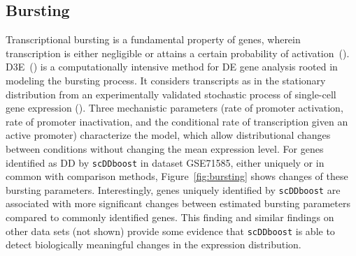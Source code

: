 \documentclass[aoas,preprint]{imsart}
\begin{document}





\subsection{Bursting}


Transcriptional bursting is a fundamental property of genes, wherein transcription is either
negligible or attains a certain probability of activation~(\cite{Raj:2008aa}). 
D3E~(\cite{ref:d3e}) is a computationally intensive 
method for DE gene analysis rooted in modeling the bursting process. It 
considers transcripts as in the stationary distribution from an 
experimentally validated stochastic process of single-cell gene expression (\cite{Peccoud:1995aa}). 
Three mechanistic parameters (rate of promoter activation, rate of promoter inactivation, 
 and the conditional rate of transcription given an active  promoter) characterize the model, which allow
 distributional changes between conditions without changing the mean expression level.
For genes identified as DD by \verb+scDDboost+ in dataset GSE71585, either uniquely or in common with
comparison methods, Figure~\ref{fig:bursting} shows  changes of these bursting parameters. Interestingly, 
 genes uniquely identified by \verb+scDDboost+ are associated with more 
significant changes between estimated bursting parameters compared to commonly identified genes.
This finding and similar findings on other data sets (not shown) provide some evidence that \verb+scDDboost+
is able to detect biologically meaningful changes in the expression distribution.
\end{document}
